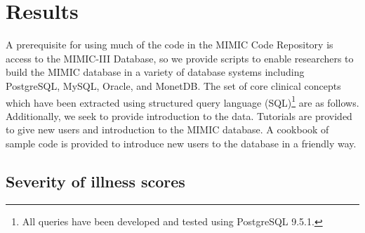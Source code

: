\documentclass{elsart}
\begin{document}



\section{Results}

A prerequisite for using much of the code in the MIMIC Code Repository is access to the MIMIC-III Database, so we provide scripts to enable researchers to build the MIMIC database in a variety of database systems including PostgreSQL, MySQL, Oracle, and MonetDB. The set of core clinical concepts which have been extracted using structured query language (SQL)\footnote{All queries have been developed and tested using PostgreSQL 9.5.1.} are as follows. Additionally, we seek to provide introduction to the data. Tutorials are provided to give new users and introduction to the MIMIC database. A cookbook of sample code is provided to introduce new users to the database in a friendly way. 

\subsection{Severity of illness scores}


\end{document}
